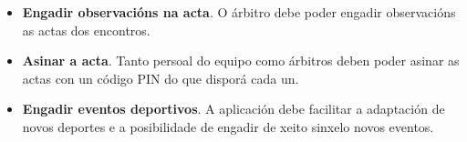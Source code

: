 \begin{itemize}
    \item \textbf{Engadir observacións na acta}.
    O árbitro debe poder engadir observacións as actas dos encontros.

    \item \textbf{Asinar a acta}.
    Tanto persoal do equipo como árbitros deben poder asinar as actas con un 
código PIN do que disporá cada un.

    \item \textbf{Engadir eventos deportivos}.
    A aplicación debe facilitar a adaptación de novos deportes e a posibilidade 
de engadir de xeito sinxelo novos eventos.

    \end{itemize}


